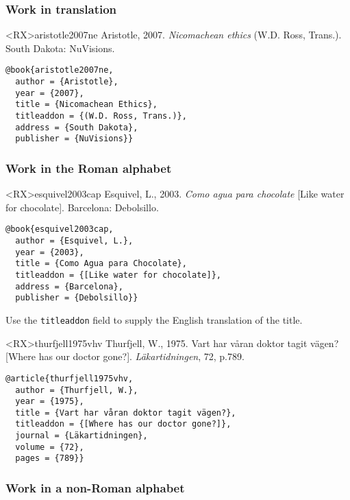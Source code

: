 \documentclass[10pt,a4paper]{article}
\newenvironment{tips}{%
  \begin{list}{\makebox[2em][c]{\faLightbulbO}}{%
    \setlength{\leftmargin}{2em}
    \setlength{\labelwidth}{2em}
    \setlength{\labelsep}{0pt}}
}{\end{list}}
\begin{document}
\subsubsection*{Work in translation}

\begin{bibexbox}<RX>{aristotle2007ne}
  Aristotle, 2007. \emph{Nicomachean ethics} (W.D. Ross, Trans.). South Dakota: NuVisions.
  \tcblower
\begin{Verbatim}
@book{aristotle2007ne,
  author = {Aristotle},
  year = {2007},
  title = {Nicomachean Ethics},
  titleaddon = {(W.D. Ross, Trans.)},
  address = {South Dakota},
  publisher = {NuVisions}}
\end{Verbatim}
\end{bibexbox}

\subsubsection*{Work in the Roman alphabet}

\begin{bibexbox}<RX>{esquivel2003cap}
  Esquivel, L., 2003. \emph{Como agua para chocolate} [Like water for chocolate]. Barcelona: Debolsillo.
  \tcblower
\begin{Verbatim}
@book{esquivel2003cap,
  author = {Esquivel, L.},
  year = {2003},
  title = {Como Agua para Chocolate},
  titleaddon = {[Like water for chocolate]},
  address = {Barcelona},
  publisher = {Debolsillo}}
\end{Verbatim}
\end{bibexbox}

\begin{tips}\item
Use the \texttt{titleaddon} field to supply the English translation of the title.
\end{tips}

\begin{bibexbox}<RX>{thurfjell1975vhv}
  Thurfjell, W., 1975. Vart har våran doktor tagit vägen? [Where has our doctor gone?]. \emph{Läkartidningen}, 72, p.789.
  \tcblower
\begin{Verbatim}
@article{thurfjell1975vhv,
  author = {Thurfjell, W.},
  year = {1975},
  title = {Vart har våran doktor tagit vägen?},
  titleaddon = {[Where has our doctor gone?]},
  journal = {Läkartidningen},
  volume = {72},
  pages = {789}}
\end{Verbatim}
\end{bibexbox}

\subsubsection*{Work in a non-Roman alphabet}
\end{document}
